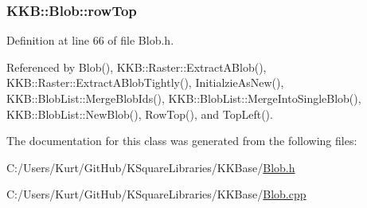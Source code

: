 \subsubsection[{\texorpdfstring{row\+Top}{rowTop}}]{ K\+K\+B\+::\+Blob\+::row\+Top}\hypertarget{class_k_k_b_1_1_blob_adeb391a75a10791e7f59566eafa847ae}{}\label{class_k_k_b_1_1_blob_adeb391a75a10791e7f59566eafa847ae}


Definition at line 66 of file Blob.\+h.



Referenced by Blob(), K\+K\+B\+::\+Raster\+::\+Extract\+A\+Blob(), K\+K\+B\+::\+Raster\+::\+Extract\+A\+Blob\+Tightly(), Initialzie\+As\+New(), K\+K\+B\+::\+Blob\+List\+::\+Merge\+Blob\+Ids(), K\+K\+B\+::\+Blob\+List\+::\+Merge\+Into\+Single\+Blob(), K\+K\+B\+::\+Blob\+List\+::\+New\+Blob(), Row\+Top(), and Top\+Left().



The documentation for this class was generated from the following files\+:\begin{DoxyCompactItemize}
\item 
C\+:/\+Users/\+Kurt/\+Git\+Hub/\+K\+Square\+Libraries/\+K\+K\+Base/\hyperlink{_blob_8h}{Blob.\+h}\item 
C\+:/\+Users/\+Kurt/\+Git\+Hub/\+K\+Square\+Libraries/\+K\+K\+Base/\hyperlink{_blob_8cpp}{Blob.\+cpp}\end{DoxyCompactItemize}
